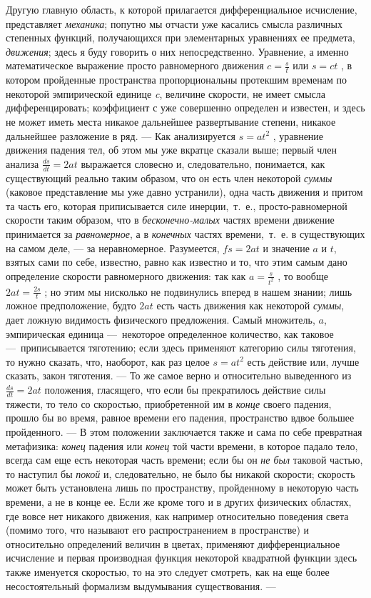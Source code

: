 Другую главную область, к которой прилагается дифференциальное исчисление,
представляет {\em механика}; попутно мы отчасти уже
касались смысла различных степенных функций, получающихся при элементарных
уравнениях ее предмета, {\em движения}; здесь я буду
говорить о них непосредственно. Уравнение, а именно математическое
выражение просто равномерного движения  $c=\frac s t$  или  $s=\mathit{ct}$
, в котором пройденные пространства пропорциональны протекшим временам по
некоторой эмпирической единице {\em c}, величине
скорости, не имеет смысла дифференцировать; коэффициент с уже совершенно
определен и известен, и здесь не может иметь места никакое дальнейшее
развертывание степени, никакое дальнейшее разложение в ряд. — Как
анализируется  $s=at^2$ , уравнение движения падения тел, об этом мы уже
вкратце сказали выше; первый член анализа 
$\frac{\mathit{ds}}{\mathit{dt}}=2\mathit{at}$  выражается словесно и,
следовательно, понимается, как существующий реально таким образом, что он
есть член некоторой {\em суммы} (каковое представление
мы уже давно устранили), одна часть движения и притом та часть его, которая
приписывается силе инерции,~т.~е., просто-равномерной скорости таким
образом, что в {\em бесконечно-малых} частях времени
движение принимается за {\em равномерное}, а в
{\em конечных} частях времени,~т.~е. в существующих на
самом деле, — за неравномерное. Разумеется,  $\mathit{fs}=2\mathit{at}$  и
значение $a$ и $t$, взятых
сами по себе, известно, равно как известно и то, что этим самым дано
определение скорости равномерного движения: так как  $a=\frac s{t^2}$ , то
вообще  $2\mathit{at}=\frac{2s} t$ ; но этим мы нисколько не подвинулись
вперед в нашем знании; лишь ложное предположение, будто  $2\mathit{at}$ 
есть часть движения как некоторой {\em суммы}, дает
ложную видимость физического предложения. Самый множитель,
$a$, эмпирическая единица —~некоторое определенное
количество, как таковое —~приписывается тяготению; если здесь применяют
категорию силы тяготения, то нужно сказать, что, наоборот, как раз целое 
$s=at^2$  есть действие или, лучше сказать, закон тяготения. — То же самое
верно и относительно выведенного из 
$\frac{\mathit{ds}}{\mathit{dt}}=2\mathit{at}$  положения, гласящего, что
если бы прекратилось действие силы тяжести, то тело со скоростью,
приобретенной им в {\em конце} своего падения, прошло
бы во время, равное времени его падения, пространство вдвое большее
пройденного. — В этом положении заключается также и сама по себе превратная
метафизика: {\em конец} падения или
{\em конец} той части времени, в которое падало тело,
всегда сам еще есть некоторая часть времени; если бы он
{\em не был} таковой частью, то наступил бы
{\em покой} и, следовательно, не было бы никакой
скорости; скорость может быть установлена лишь по пространству, пройденному
в некоторую часть времени, а не в конце ее. Если же кроме того и в других
физических областях, где вовсе нет никакого движения, как например
относительно поведения света (помимо того, что называют его
распространением в пространстве) и относительно определений величин в
цветах, применяют дифференциальное исчисление и первая производная функция
некоторой квадратной функции здесь также именуется скоростью, то на это
следует смотреть, как на еще более несостоятельный формализм выдумывания
существования. —

